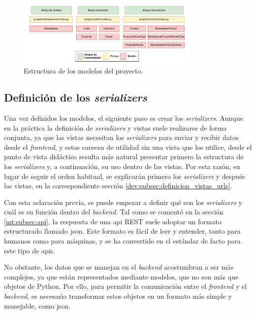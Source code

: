 \begin{figure}[H]
    \centering
    \includegraphics[width=0.8\textwidth]{figures/design_develop/estructura_modelos.pdf}
    \caption{Estructura de los modelos del proyecto.}
    \label{dev:fig:estructura_modelos}
\end{figure}

\subsection{Definición de los \textit{serializers}}
\label{dev:subsec:definicion_serializers}

Una vez definidos los modelos, el siguiente paso es crear los \textit{serializers}. Aunque en la práctica la definición de \textit{serializers} y vistas suele realizarse de forma conjunta, ya que las vistas necesitan los \textit{serializers} para enviar y recibir datos desde el \textit{frontend}, y estos carecen de utilidad sin una vista que los utilice, desde el punto de vista didáctico resulta más natural presentar primero la estructura de los \textit{serializers} y, a continuación, su uso dentro de las vistas. Por esta razón, en lugar de seguir el orden habitual, se explicarán primero los \textit{serializers} y después las vistas, en la correspondiente sección \ref{dev:subsec:definicion_vistas_urls}.

Con esta aclaración previa, se puede empezar a definir qué son los \textit{serializers} y cuál es su función dentro del \textit{backend}. Tal como se comentó en la sección \ref{mt:subsec:api}, la respuesta de una \gls{api} REST suele adoptar un formato estructurado llamado \gls{json}. Este formato es fácil de leer y entender, tanto para humanos como para máquinas, y se ha convertido en el estándar de facto para este tipo de \gls{api}s.

No obstante, los datos que se manejan en el \textit{backend} acostumbran a ser más complejos, ya que están representados mediante modelos, que no son más que objetos de Python. Por ello, para permitir la comunicación entre el \textit{frontend} y el \textit{backend}, es necesario transformar estos objetos en un formato más simple y manejable, como \gls{json}.

